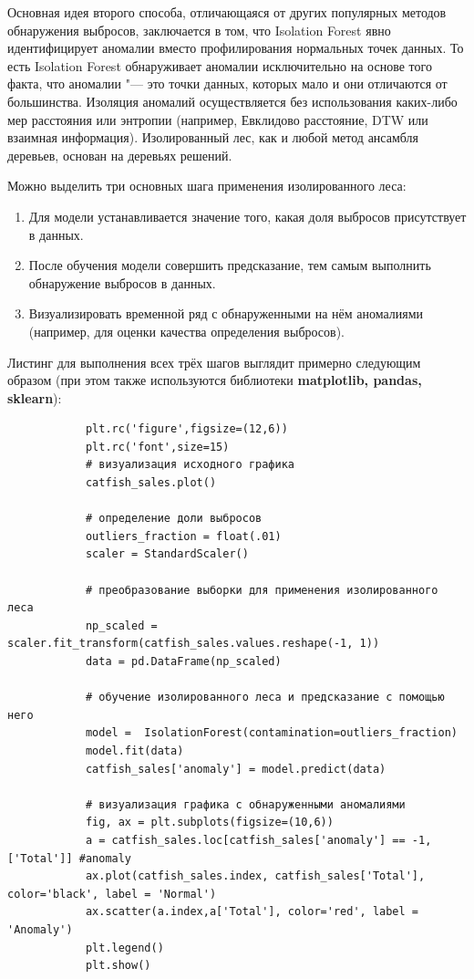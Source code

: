 \documentclass[bachelor, och, referat]{../shiza}
\begin{document}
        Основная идея второго способа, отличающаяся от других популярных методов
        обнаружения выбросов, заключается в том, что Isolation Forest явно
        идентифицирует аномалии вместо профилирования нормальных точек данных.
        То есть Isolation Forest обнаруживает аномалии исключительно на основе
        того факта, что аномалии "--- это точки данных, которых мало и они
        отличаются от большинства. Изоляция аномалий осуществляется без
        использования каких-либо мер расстояния или энтропии (например,
        Евклидово расстояние, DTW или взаимная информация). Изолированный лес,
        как и любой метод ансамбля деревьев, основан на деревьях решений.

        Можно выделить три основных шага применения изолированного леса:

        \begin{enumerate}
            \item Для модели устанавливается значение того, какая доля выбросов
            присутствует в данных.
            \item После обучения модели совершить предсказание, тем самым
            выполнить обнаружение выбросов в данных.
            \item Визуализировать временной ряд с обнаруженными на нём
            аномалиями (например, для оценки качества определения выбросов).
        \end{enumerate}

        Листинг для выполнения всех трёх шагов выглядит примерно следующим
        образом (при этом также используются библиотеки \textbf{matplotlib,
        pandas, sklearn}):

        \begin{verbatim}
            plt.rc('figure',figsize=(12,6))
            plt.rc('font',size=15)
            # визуализация исходного графика
            catfish_sales.plot()

            # определение доли выбросов
            outliers_fraction = float(.01)
            scaler = StandardScaler()
            
            # преобразование выборки для применения изолированного леса
            np_scaled = scaler.fit_transform(catfish_sales.values.reshape(-1, 1))
            data = pd.DataFrame(np_scaled)

            # обучение изолированного леса и предсказание с помощью него
            model =  IsolationForest(contamination=outliers_fraction)
            model.fit(data)
            catfish_sales['anomaly'] = model.predict(data)

            # визуализация графика с обнаруженными аномалиями
            fig, ax = plt.subplots(figsize=(10,6))
            a = catfish_sales.loc[catfish_sales['anomaly'] == -1, ['Total']] #anomaly
            ax.plot(catfish_sales.index, catfish_sales['Total'], color='black', label = 'Normal')
            ax.scatter(a.index,a['Total'], color='red', label = 'Anomaly')
            plt.legend()
            plt.show()
        \end{verbatim}
\end{document}
